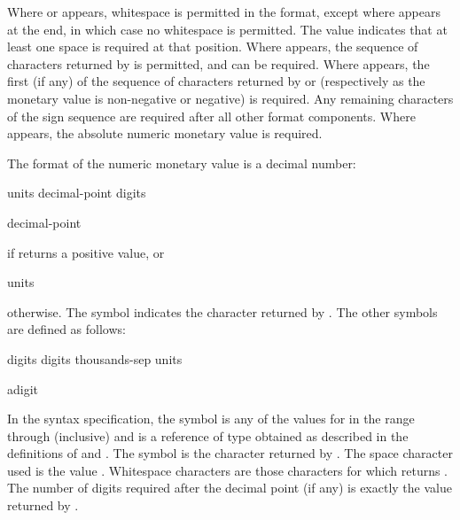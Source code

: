 \pnum
Where  or  appears,
whitespace is permitted in the format,
except where  appears at the end,
in which case no whitespace is permitted.
The value  indicates that
at least one space is required at that position.
Where  appears,
the sequence of characters returned by  is permitted, and
can be required.
Where  appears,
the first (if any) of the sequence of characters returned by
 or 
(respectively as the monetary value is non-negative or negative) is required.
Any remaining characters of the sign sequence are required after
all other format components.
Where  appears, the absolute numeric monetary value is required.

\pnum
The format of the numeric monetary value is a decimal number:
\begin{ncbnf}
\br
    units \br
    decimal-point digits
\end{ncbnf}
\begin{ncbnf}
\br
    decimal-point 
\end{ncbnf}
if  returns a positive value, or
\begin{ncbnf}
\br
    units
\end{ncbnf}
otherwise.
The symbol 
indicates the character returned by .
The other symbols are defined as follows:

\begin{ncbnf}
\br
    digits\br
    digits thousands-sep units
\end{ncbnf}

\begin{ncbnf}
\br
    adigit 
\end{ncbnf}

In the syntax specification,
the symbol  is any of the values 
for  in the range  through  (inclusive) and
 is a reference of type 
obtained as described in the definitions
of  and .
The symbol 
is the character returned by .
The space character used is the value .
Whitespace characters are those characters 
for which  returns .
The number of digits required after the decimal point (if any)
is exactly the value returned by .

